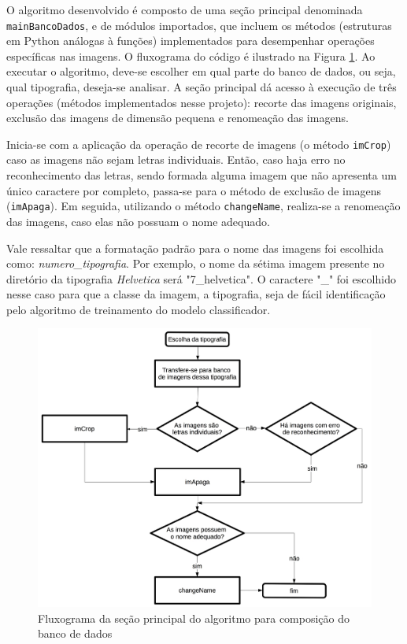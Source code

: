 O algoritmo desenvolvido é composto de uma seção principal denominada \texttt{mainBancoDados}, e de módulos importados, que incluem os métodos (estruturas em Python análogas à funções) implementados para desempenhar operações específicas nas imagens. O fluxograma do código é ilustrado na Figura \ref{fig:flowMain}. Ao executar o algoritmo, deve-se escolher em qual parte do banco de dados, ou seja, qual tipografia, deseja-se analisar. A seção principal dá acesso à execução de três operações (métodos implementados nesse projeto): recorte das imagens originais, exclusão das imagens de dimensão pequena e renomeação das imagens.

Inicia-se com a aplicação da operação de recorte de imagens (o método \texttt{imCrop}) caso as imagens não sejam letras individuais. Então, caso haja erro no reconhecimento das letras, sendo formada alguma imagem que não apresenta um único caractere por completo, passa-se para o método de exclusão de imagens (\texttt{imApaga}). Em seguida, utilizando o método \texttt{changeName}, realiza-se a renomeação das imagens, caso elas não possuam o nome adequado.

 Vale ressaltar que a formatação padrão para o nome das imagens foi escolhida como: \textit{numero\_tipografia}. Por exemplo, o nome da sétima imagem presente no diretório da tipografia \textit{Helvetica} será "7\_helvetica". O caractere "\_" {} foi escolhido nesse caso para que a classe da imagem, a tipografia, seja de fácil identificação pelo algoritmo de treinamento do modelo classificador.


\begin{figure}[h!]
  \centering
  \includegraphics[width=0.9\linewidth]{figuras/mainbancodados.pdf}
  \caption{Fluxograma da seção principal do algoritmo para composição do banco de dados}
  \label{fig:flowMain}
\end{figure}

